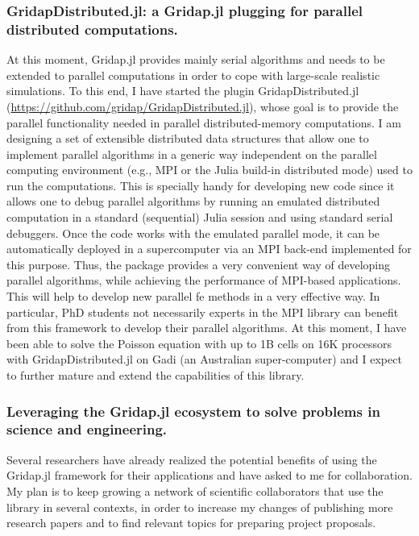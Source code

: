 \documentclass{article}
\begin{document}
 
\subsubsection{GridapDistributed.jl: a  Gridap.jl plugging for parallel distributed computations.} 

At this moment, Gridap.jl provides mainly serial algorithms and needs to be extended to parallel computations in order to cope with large-scale realistic simulations. To this end, I have started the plugin GridapDistributed.jl (\url{https://github.com/gridap/GridapDistributed.jl}), whose goal is to provide the parallel functionality needed in parallel distributed-memory computations. I am designing a set of extensible distributed data structures that allow one to implement parallel algorithms in a generic way independent on the parallel computing environment (e.g., MPI or the Julia build-in distributed mode) used to run the computations. This is specially handy for developing new code since it allows one to debug parallel algorithms by running an emulated distributed computation in a standard (sequential) Julia session and using standard serial debuggers.  Once the code works with the emulated parallel mode, it can be automatically deployed in a supercomputer via an MPI back-end implemented for this purpose. Thus, the package provides a very convenient way of developing parallel algorithms, while achieving the performance of MPI-based applications. This will help to develop new parallel \ac{fe} methods in a very effective way. In particular, PhD students not necessarily experts in the MPI library can benefit from this framework to develop their parallel algorithms. At this moment, I have been able to solve the Poisson equation with up to 1B cells on 16K processors with GridapDistributed.jl on Gadi (an Australian super-computer) and I expect to further mature and extend the capabilities of this library.  
 
\subsubsection{Leveraging the Gridap.jl ecosystem to solve problems in science and engineering.}

Several researchers have already realized the potential benefits of using the Gridap.jl framework for their applications and have asked to me for collaboration. My plan is to keep growing a network of scientific collaborators that use the library in several contexts, in order to increase my changes of publishing more research papers and to find relevant topics for preparing project proposals.
\end{document}
